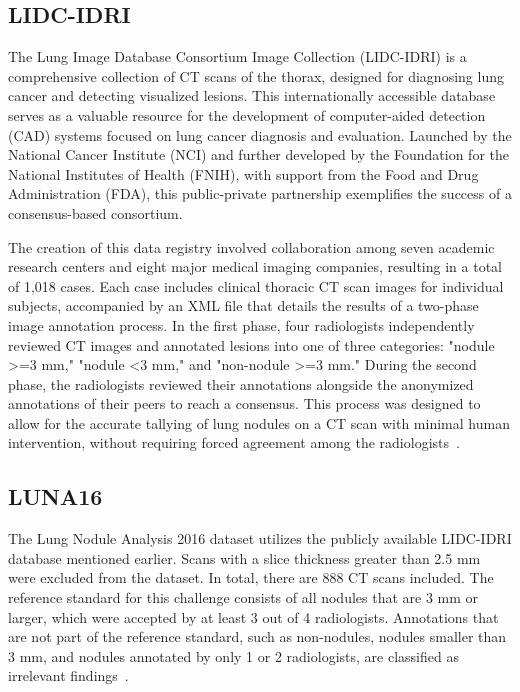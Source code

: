 \subsection{LIDC-IDRI}\label{lidc}
The Lung Image Database Consortium Image Collection (LIDC-IDRI) is a comprehensive collection of CT scans of the thorax, designed for diagnosing lung cancer and detecting visualized lesions. This internationally accessible database serves as a valuable resource for the development of computer-aided detection (CAD) systems focused on lung cancer diagnosis and evaluation. Launched by the National Cancer Institute (NCI) and further developed by the Foundation for the National Institutes of Health (FNIH), with support from the Food and Drug Administration (FDA), this public-private partnership exemplifies the success of a consensus-based consortium.

The creation of this data registry involved collaboration among seven academic research centers and eight major medical imaging companies, resulting in a total of 1,018 cases. Each case includes clinical thoracic CT scan images for individual subjects, accompanied by an XML file that details the results of a two-phase image annotation process. In the first phase, four radiologists independently reviewed CT images and annotated lesions into one of three categories: "nodule >=3 mm," "nodule <3 mm," and "non-nodule >=3 mm." During the second phase, the radiologists reviewed their annotations alongside the anonymized annotations of their peers to reach a consensus. This process was designed to allow for the accurate tallying of lung nodules on a CT scan with minimal human intervention, without requiring forced agreement among the radiologists~\cite{armato_iii_data_2015}.

\subsection{LUNA16}\label{luna16}
The Lung Nodule Analysis 2016 dataset utilizes the publicly available LIDC-IDRI database mentioned earlier. Scans with a slice thickness greater than 2.5 mm were excluded from the dataset. In total, there are 888 CT scans included. The reference standard for this challenge consists of all nodules that are 3 mm or larger, which were accepted by at least 3 out of 4 radiologists. Annotations that are not part of the reference standard, such as non-nodules, nodules smaller than 3 mm, and nodules annotated by only 1 or 2 radiologists, are classified as irrelevant findings~\cite{setio_luna16_2016}.

